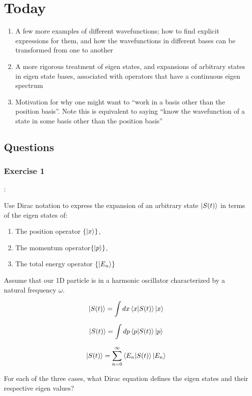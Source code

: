 \documentclass{article}
\begin{document}
\section{Today}

\begin{enumerate}
    \item A few more examples of different wavefunctions; how to find explicit expressions for them, and how the wavefunctions in different bases can be transformed from one to another
    \item A more rigorous treatment of eigen states, and expansions of arbitrary states in eigen state bases, associated with operators that have a continuous eigen spectrum
    \item Motivation for why one might want to “work in a basis other than the position basis”.  Note this is equivalent to saying “know the wavefunction of a state in some basis other than the position basis” 
\end{enumerate}

\subsection{Questions}

\subsubsection{Exercise 1}:

Use Dirac notation to express the expansion of an arbitrary state $\ket{S(t)}$ in terms of the eigen states of:

\begin{enumerate}
    \item The position operator $\{\ket{x}\}$,
    \item The momentum operator$\{\ket{p}\}$, 
    \item The total energy operator $\{\ket{E_n}\}$
\end{enumerate}

Assume that our 1D particle is in a harmonic oscillator characterized by a natural frequency $\omega$. 

$$\ket{S(t)} = \int dx \braket{x|S(t)} \ket{x}$$

$$\ket{S(t)} = \int dp \braket{p|S(t)} \ket{p}$$

$$\ket{S(t)} = \sum_{n=0}^\infty \braket{E_n|S(t)} \ket{E_n}$$

For each of the three cases, what Dirac equation defines the eigen states and their respective eigen values?
\end{document}
